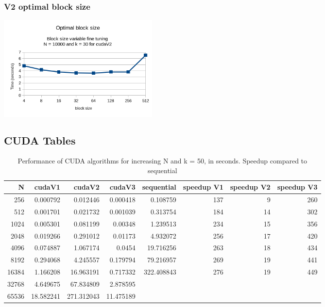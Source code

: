 \documentclass[11pt]{article}
\begin{document}
\subsubsection{V2 optimal block size}
\label{sec:org327346a}
\begin{center}
\includegraphics[height=200]{./images/block-size-effect.png}
\end{center}
\pagebreak
\subsection{CUDA Tables}
\label{sec:org873d7bf}
\begin{table}[htbp]
\caption{Performance of CUDA algorithms for increasing N and k = 50, in seconds. Speedup compared to sequential}
\centering
\begin{tabular}{rrrrrrrr}
\hline
N & cudaV1 & cudaV2 & cudaV3 & sequential & speedup V1 & speedup V2 & speedup V3\\[0pt]
\hline
256 & 0.000792 & 0.012446 & 0.000418 & 0.108759 & 137 & 9 & 260\\[0pt]
512 & 0.001701 & 0.021732 & 0.001039 & 0.313754 & 184 & 14 & 302\\[0pt]
1024 & 0.005301 & 0.081199 & 0.00348 & 1.239513 & 234 & 15 & 356\\[0pt]
2048 & 0.019266 & 0.291012 & 0.01173 & 4.932072 & 256 & 17 & 420\\[0pt]
4096 & 0.074887 & 1.067174 & 0.0454 & 19.716256 & 263 & 18 & 434\\[0pt]
8192 & 0.294068 & 4.245557 & 0.179794 & 79.216957 & 269 & 19 & 441\\[0pt]
16384 & 1.166208 & 16.963191 & 0.717332 & 322.408843 & 276 & 19 & 449\\[0pt]
32768 & 4.649675 & 67.834809 & 2.878595 &  &  &  & \\[0pt]
65536 & 18.582241 & 271.312043 & 11.475189 &  &  &  & \\[0pt]
\hline
\end{tabular}
\end{table}
\end{document}
